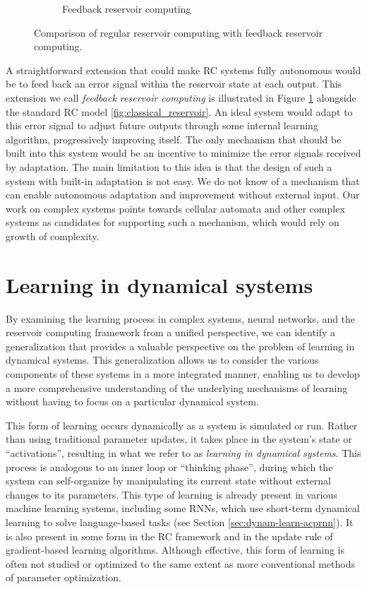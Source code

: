 \begin{figure}[htbp]
\begin{subfigure}[t]{.45\linewidth}
    \caption{Feedback reservoir computing}
    \label{fig:feedback_reservoir}
  \end{subfigure}
  \caption{Comparison of regular reservoir computing with feedback reservoir
    computing.}
  \label{"waiting for reftex-label call..."}
\end{figure}

A straightforward extension that could make \ac{RC} systems fully autonomous
would be to feed back an error signal within the reservoir state at each
output. This extension we call \emph{feedback reservoir computing} is
illustrated in Figure \ref{fig:feedback_reservoir} alongside the standard
\ac{RC} model \ref{fig:classical_reservoir}. An ideal system would adapt to this
error signal to adjust future outputs through some internal learning algorithm,
progressively improving itself. The only mechanism that should be built into
this system would be an incentive to minimize the error signals received by
adaptation. The main limitation to this idea is that the design of such a system with
built-in adaptation is not easy. We do not know of a mechanism that can enable
autonomous adaptation and improvement without external input. Our work on
complex systems points towards cellular automata and other complex systems as
candidates for supporting such a mechanism, which would rely on growth of
complexity.

\section{Learning in dynamical systems}

By examining the learning process in complex systems, neural networks, and
the reservoir computing framework from a unified perspective, we can
identify a generalization that provides a valuable perspective on the problem of
learning in dynamical systems. This generalization allows us to consider the
various components of these systems in a more integrated manner, enabling us to
develop a more comprehensive understanding of the underlying mechanisms of
learning without having to focus on a particular dynamical system.

This form of learning occurs dynamically as a system is simulated or run. Rather
than using traditional parameter updates, it takes place in the system's
state or ``activations'', resulting in what we refer to as \emph{learning in
  dynamical systems}. This process is analogous to an inner loop or ``thinking phase'', during which the system can self-organize by manipulating its current
state without external changes to its parameters. This type of learning is
already present in various machine learning systems, including some \acfp{RNN},
which use short-term dynamical learning to solve language-based tasks (see
Section \ref{sec:dynam-learn-acprnn}). It is also present in some form in the
\ac{RC} framework and in the update rule of gradient-based learning algorithms.
Although effective, this form of learning is often not studied or optimized to the
same extent as more conventional methods of parameter optimization.

